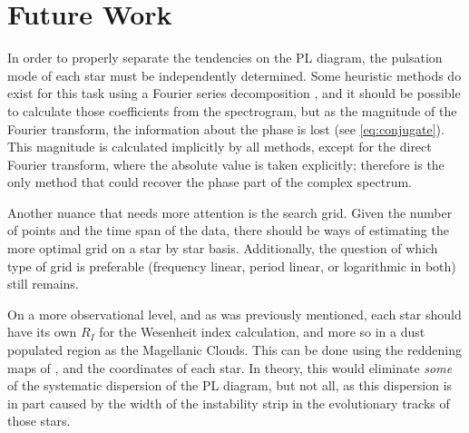 \section{Future Work}

In order to properly separate the tendencies on the PL diagram, the pulsation mode of each star must be independently determined.
Some heuristic methods do exist for this task using a Fourier series decomposition \citep{Zabolotski2005}, 
and it should be possible to calculate those coefficients from the spectrogram,
but as the magnitude of the Fourier transform, the information about the phase is lost (see \autoref{eq:conjugate}).
This magnitude is calculated implicitly by all methods, except for the direct Fourier transform, where the absolute value is taken explicitly;
therefore is the only method that could recover the phase part of the complex spectrum.

Another nuance that needs more attention is the search grid. 
Given the number of points and the time span of the data, 
there should be ways of estimating the more optimal grid on a star by star basis.
Additionally, the question of which type of grid is preferable (frequency linear, period linear, or logarithmic in both) still remains.

On a more observational level, and as was previously mentioned, 
each star should have its own $R_I$ for the Wesenheit index calculation, and more so in a dust populated region as the Magellanic Clouds.
This can be done using the reddening maps of \cite{Reddening2021}, and the coordinates of each star.
In theory, this would eliminate \textit{some} of the systematic dispersion of the PL diagram,
but not all, as this dispersion is in part caused by the width of the instability strip in the evolutionary tracks of those stars.





